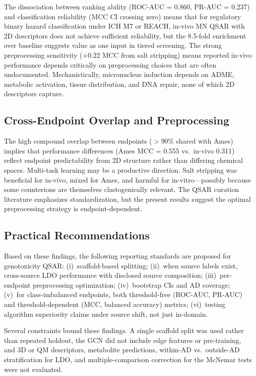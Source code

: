 The dissociation between ranking ability (ROC-AUC = 0.860, PR-AUC = 0.237) and classification reliability (MCC CI crossing zero) means 
that for regulatory binary hazard classification under ICH M7\cite{ICH_M7_2017} or REACH,\cite{EU_REACH_2006} in-vivo MN QSAR with 2D descriptors does not achieve sufficient reliability,
but the 8.5-fold enrichment over baseline suggests value as one input in tiered screening.\cite{Dobo_2012} 
The strong preprocessing sensitivity ($+0.22$ MCC from salt stripping) means reported in-vivo performance depends critically on preprocessing choices 
that are often undocumented.\cite{Fourches_2016} Mechanistically, micronucleus induction depends on ADME, metabolic activation, tissue distribution, 
and DNA repair,\cite{Tweats_2007,Kirkland_2011} none of which 2D descriptors capture.

\subsection{Cross-Endpoint Overlap and Preprocessing}

The high compound overlap between endpoints ($>$90\% shared with Ames) implies that performance differences (Ames MCC = 0.555 vs.\ in-vivo 0.311) reflect endpoint predictability from 2D structure rather than 
differing chemical spaces.\cite{Tropsha_2010} Multi-task learning may be a productive direction.\cite{Ramsundar_2015} 
Salt stripping was beneficial for in-vivo, mixed for Ames, and harmful for in-vitro---possibly because some counterions are themselves clastogenically relevant. 
The QSAR curation literature\cite{Fourches_2010,Fourches_2016} emphasizes standardization, but the present results suggest the optimal preprocessing strategy is endpoint-dependent.

\subsection{Practical Recommendations}

Based on these findings, the following reporting standards are proposed for genotoxicity QSAR: 
(i)~scaffold-based splitting; 
(ii)~when source labels exist, cross-source LDO performance with disclosed source composition; 
(iii)~per-endpoint preprocessing optimization; 
(iv)~bootstrap CIs and AD coverage; (v)~for class-imbalanced endpoints, both threshold-free (ROC-AUC, PR-AUC) and threshold-dependent (MCC, balanced accuracy) metrics; 
(vi)~testing algorithm superiority claims under source shift, not just in-domain.

Several constraints bound these findings. A single scaffold split was used rather than repeated holdout, the GCN did not include edge features or pre-training,\cite{Hu_2020_pretrain} 
and 3D or QM descriptors, metabolite predictions, within-AD vs.\ outside-AD stratification for LDO, and multiple-comparison correction for the McNemar tests\cite{Demsar_2006} were not evaluated.
